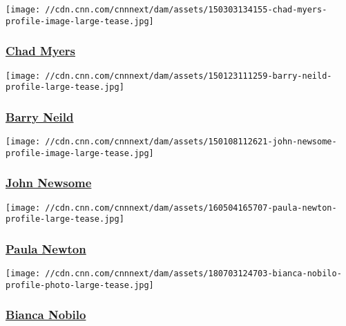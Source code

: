 \href{/profiles/chad-myers-profile}{}

\texttt{[image: //cdn.cnn.com/cnnnext/dam/assets/150303134155-chad-myers-profile-image-large-tease.jpg]}

\hypertarget{chad-myers}{%
\subsubsection{\texorpdfstring{\href{/profiles/chad-myers-profile}{Chad
Myers}}{Chad Myers}}\label{chad-myers}}

\href{/profiles/barry-neild}{}

\texttt{[image: //cdn.cnn.com/cnnnext/dam/assets/150123111259-barry-neild-profile-large-tease.jpg]}

\hypertarget{barry-neild}{%
\subsubsection{\texorpdfstring{\href{/profiles/barry-neild}{Barry
Neild}}{Barry Neild}}\label{barry-neild}}

\href{/profiles/john-newsome}{}

\texttt{[image: //cdn.cnn.com/cnnnext/dam/assets/150108112621-john-newsome-profile-image-large-tease.jpg]}

\hypertarget{john-newsome}{%
\subsubsection{\texorpdfstring{\href{/profiles/john-newsome}{John
Newsome}}{John Newsome}}\label{john-newsome}}

\href{/profiles/paula-newton-profile}{}

\texttt{[image: //cdn.cnn.com/cnnnext/dam/assets/160504165707-paula-newton-profile-large-tease.jpg]}

\hypertarget{paula-newton}{%
\subsubsection{\texorpdfstring{\href{/profiles/paula-newton-profile}{Paula
Newton}}{Paula Newton}}\label{paula-newton}}

\href{/profiles/bianca-nobilo}{}

\texttt{[image: //cdn.cnn.com/cnnnext/dam/assets/180703124703-bianca-nobilo-profile-photo-large-tease.jpg]}

\hypertarget{bianca-nobilo-}{%
\subsubsection{\texorpdfstring{\href{/profiles/bianca-nobilo}{Bianca
Nobilo }}{Bianca Nobilo }}\label{bianca-nobilo-}}

